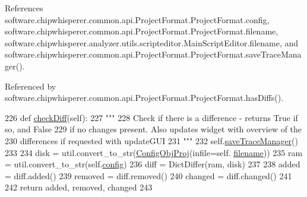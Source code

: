 References software.\+chipwhisperer.\+common.\+api.\+Project\+Format.\+Project\+Format.\+config, software.\+chipwhisperer.\+common.\+api.\+Project\+Format.\+Project\+Format.\+filename, software.\+chipwhisperer.\+analyzer.\+utils.\+scripteditor.\+Main\+Script\+Editor.\+filename, and software.\+chipwhisperer.\+common.\+api.\+Project\+Format.\+Project\+Format.\+save\+Trace\+Manager().



Referenced by software.\+chipwhisperer.\+common.\+api.\+Project\+Format.\+Project\+Format.\+has\+Diffs().


\begin{DoxyCode}
226     \textcolor{keyword}{def }\hyperlink{classsoftware_1_1chipwhisperer_1_1common_1_1api_1_1ProjectFormat_1_1ProjectFormat_a85550c4dded22f0d1a542d6974a7399a}{checkDiff}(self):
227         \textcolor{stringliteral}{"""}
228 \textcolor{stringliteral}{        Check if there is a difference - returns True if so, and False}
229 \textcolor{stringliteral}{        if no changes present. Also updates widget with overview of the}
230 \textcolor{stringliteral}{        differences if requested with updateGUI}
231 \textcolor{stringliteral}{        """}
232         self.\hyperlink{classsoftware_1_1chipwhisperer_1_1common_1_1api_1_1ProjectFormat_1_1ProjectFormat_a17011dfaf0cb7ce50877a41182ed8c7e}{saveTraceManager}()
233 
234         disk = util.convert\_to\_str(\hyperlink{classsoftware_1_1chipwhisperer_1_1common_1_1api_1_1ProjectFormat_1_1ConfigObjProj}{ConfigObjProj}(infile=self.
      \hyperlink{classsoftware_1_1chipwhisperer_1_1common_1_1api_1_1ProjectFormat_1_1ProjectFormat_a95a501ab20646851ed4320c6db7b9297}{filename}))
235         ram = util.convert\_to\_str(self.\hyperlink{classsoftware_1_1chipwhisperer_1_1common_1_1api_1_1ProjectFormat_1_1ProjectFormat_a5111622c8372929c0eec5fdc3ab6cf42}{config})
236         diff = DictDiffer(ram, disk)
237 
238         added = diff.added()
239         removed = diff.removed()
240         changed = diff.changed()
241 
242         \textcolor{keywordflow}{return} added, removed, changed
243 
\end{DoxyCode}
\hypertarget{classsoftware_1_1chipwhisperer_1_1common_1_1api_1_1ProjectFormat_1_1ProjectFormat_a2742f1f81a01c4cb14ffab200b18e671}{}
